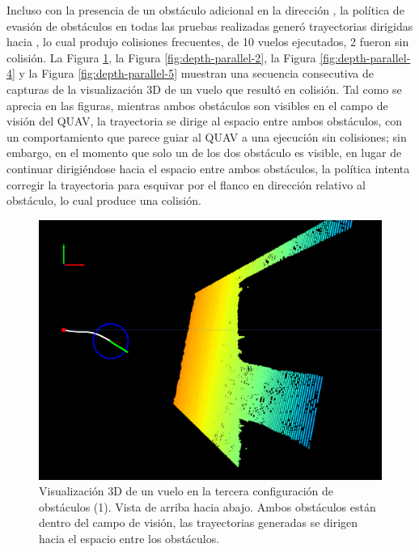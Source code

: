 Incluso con la presencia de un obstáculo adicional en la dirección , la política de evasión de obstáculos en todas las pruebas realizadas generó trayectorias dirigidas hacia , lo cual produjo colisiones frecuentes, de 10 vuelos ejecutados, 2 fueron sin colisión. La Figura \ref{fig:depth-parallel-1}, la Figura \ref{fig:depth-parallel-2},  la Figura \ref{fig:depth-parallel-4} y la Figura \ref{fig:depth-parallel-5} muestran una secuencia consecutiva de capturas de la visualización 3D de un vuelo que resultó en colisión. Tal como se aprecia en las figuras, mientras ambos obstáculos son visibles en el campo de visión del QUAV, la trayectoria se dirige al espacio entre ambos obstáculos, con un comportamiento que parece guiar al QUAV a una ejecución sin colisiones; sin embargo, en el momento que solo un de los dos obstáculo es visible, en lugar de continuar dirigiéndose hacia el espacio entre ambos obstáculos, la política intenta corregir la trayectoria para esquivar por el flanco en dirección  relativo al obstáculo, lo cual produce una colisión. 

\begin{figure}[H]
    \centering
    \includegraphics[scale=0.3]{partes/img/depth-parallel-1-topdown.png}
    \caption[Visualización 3D de un vuelo en la tercera configuración de obstáculos (1). Vista de arriba hacia abajo.]{Visualización 3D de un vuelo en la tercera configuración de obstáculos (1). Vista de arriba hacia abajo. Ambos obstáculos están dentro del campo de visión, las trayectorias generadas se dirigen hacia el espacio entre los obstáculos.}
    \label{fig:depth-parallel-1}
\end{figure}

